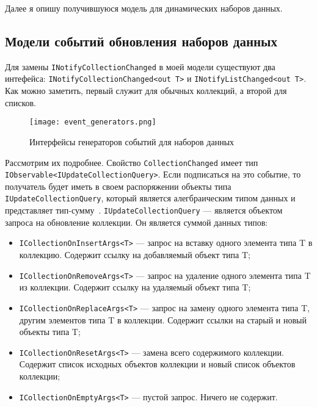 Далее я опишу получившуюся модель для динамических наборов данных.

\subsection{Модели событий обновления наборов данных}
\label{sub:research:event_model}

Для замены \lstinline[style=csharpinlinestyle]!INotifyCollectionChanged! в моей модели существуют два интефейса:
\lstinline[style=csharpinlinestyle]!INotifyCollectionChanged<out T>! и \lstinline[style=csharpinlinestyle]!INotifyListChanged<out T>!.
Как можно заметить, первый служит для обычных коллекций, а второй для списков.

\begin{figure}[ht]
\centering
  \texttt{[image: event\_generators.png]}
  \caption{ Интерфейсы генераторов событий для наборов данных }
  \label{fig:event_generators}
\end{figure}

Рассмотрим их подробнее. Свойство \lstinline[style=csharpinlinestyle]!CollectionChanged! имеет тип \lstinline[style=csharpinlinestyle]!IObservable<IUpdateCollectionQuery>!.
Если подписаться на это событие, то получатель будет иметь в своем распоряжении объекты типа \lstinline[style=csharpinlinestyle]!IUpdateCollectionQuery!,
который является алегбраическим типом данных и представляет тип-сумму~\cite{algebraic_data_type}.
\lstinline[style=csharpinlinestyle]!IUpdateCollectionQuery! --- является объектом запроса на обновление коллекции.
Он является суммой данных типов:

\begin{itemize}
  \item \lstinline[style=csharpinlinestyle]!ICollectionOnInsertArgs<T>! --- запрос на вставку одного элемента типа T в коллекцию. Содержит ссылку на добавляемый объект типа T;
  \item \lstinline[style=csharpinlinestyle]!ICollectionOnRemoveArgs<T>! --- запрос на удаление одного элемента типа T из коллекции. Содержит ссылку на удаляемый объект типа T;
  \item \lstinline[style=csharpinlinestyle]!ICollectionOnReplaceArgs<T>! --- запрос на замену одного элемента типа T, другим элементов типа T в коллекции. Содержит ссылки на старый и новый объекты типа T;
  \item \lstinline[style=csharpinlinestyle]!ICollectionOnResetArgs<T>! --- замена всего содержимого коллекции. Содержит список исходных объектов коллекции и новый список объектов коллекции;
  \item \lstinline[style=csharpinlinestyle]!ICollectionOnEmptyArgs<T>! --- пустой запрос. Ничего не содержит.
\end{itemize}

